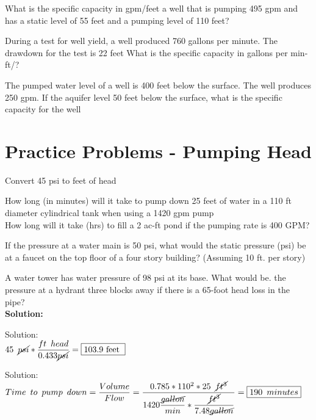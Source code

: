 What is the specific capacity in gpm/feet a well that is pumping 495 gpm and has a
static level of 55 feet and a pumping level of 110 feet?

During a test for well yield, a well produced 760 gallons per minute. The drawdown for the test is 22 feet What is the specific capacity in gallons per min-ft/?

The pumped water level of a well is 400 feet below the surface. The well produces  250 gpm.  If the aquifer level 50 feet below the surface, what is the specific capacity for the well




\section*{Practice Problems - Pumping Head}

Convert 45 psi to feet of head

How long (in minutes) will it take to pump down 25 feet of water in a 110 ft diameter cylindrical tank when using a 1420 gpm pump\\

How long will it take (hrs) to fill a 2 ac-ft pond if the pumping rate is 400 GPM?

If the pressure at a water main is 50 psi, what would the static pressure (psi) be at a faucet on the top floor of a four story building? (Assuming 10 ft. per story)

A water tower has water pressure of 98 psi at its base. What would be. the pressure at a hydrant three blocks away if there is a 65-foot head loss in the pipe?\\





\textbf{Solution:}


 Solution:\\ 
 \vspace{0.2cm}
$
45 \enspace \cancel{psi}*\dfrac{ft \enspace head}{0.433\cancel{psi}}=\boxed{103.9 \text { feet }}
$
 
 \vspace{0.2cm}
 
  Solution:\\
  
  $Time \enspace to \enspace pump \enspace down= \dfrac{Volume}{Flow}=\dfrac{0.785*110^2*25 \enspace \cancel{ft^3}}{1420\dfrac{\cancel{gallon}}{min}*\dfrac{\cancel{ft^3}}{7.48\cancel{gallon}}}=\boxed{190 \enspace minutes}$
 
